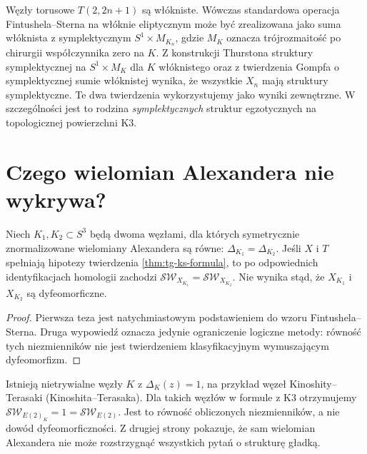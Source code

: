 \begin{uwaga}
Węzły torusowe $T(2,2n+1)$ są włókniste.
Wówczas standardowa operacja Fintushela--Sterna
na włóknie eliptycznym może być zrealizowana
jako suma włóknista z symplektycznym
$S^1\times M_{K_n}$, gdzie $M_K$ oznacza
trójrozmaitość po chirurgii współczynnika zero
na $K$. Z konstrukcji Thurstona struktury symplektycznej
na $S^1\times M_K$ dla $K$ włóknistego oraz
z twierdzenia Gompfa o symplektycznej sumie
włóknistej wynika, że wszystkie $X_n$ mają struktury
symplektyczne. Te dwa twierdzenia wykorzystujemy
jako wyniki zewnętrzne. W szczególności jest to
rodzina \emph{symplektycznych} struktur egzotycznych
na topologicznej powierzchni K3.
\end{uwaga}

\section{Czego wielomian Alexandera nie wykrywa?}
\label{sec:tg-ks-limits}

\begin{stwierdzenie}
\label{prop:tg-ks-limit}
Niech $K_1,K_2\subset S^3$ będą dwoma węzłami,
dla których symetrycznie znormalizowane wielomiany
Alexandera są równe:
$\Delta_{K_1}=\Delta_{K_2}$.
Jeśli $X$ i $T$ spełniają hipotezy twierdzenia
\ref{thm:tg-ks-formula}, to po odpowiednich
identyfikacjach homologii zachodzi
$\mathcal{SW}_{X_{K_1}}=\mathcal{SW}_{X_{K_2}}$.
Nie wynika stąd, że $X_{K_1}$ i $X_{K_2}$
są dyfeomorficzne.
\end{stwierdzenie}

\begin{proof}
Pierwsza teza jest natychmiastowym podstawieniem
do wzoru Fintushela--Sterna. Druga wypowiedź oznacza
jedynie ograniczenie logiczne metody: równość tych
niezmienników nie jest twierdzeniem klasyfikacyjnym
wymuszającym dyfeomorfizm.
\end{proof}

\begin{przyklad}
Istnieją nietrywialne węzły $K$ z $\Delta_K(z)=1$,
na przykład węzeł Kinoshity--Terasaki (Kinoshita--Terasaka).
Dla takich węzłów w formule z K3 otrzymujemy
$\mathcal{SW}_{E(2)_K}=1=\mathcal{SW}_{E(2)}$.
Jest to równość obliczonych niezmienników, a nie
dowód dyfeomorficzności. Z drugiej strony pokazuje,
że sam wielomian Alexandera nie może rozstrzygnąć
wszystkich pytań o strukturę gładką.
\end{przyklad}

